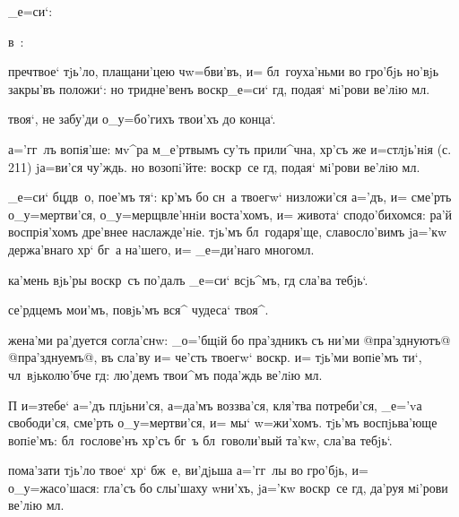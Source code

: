 
_е=си`: %

в~:%

преч твое` тjь'ло, плащани'цею ч w=бви'въ, и= 
бл~гоуха'ньми во гро'бjь но'вjь закры'въ положи`: но 
тридне'венъ воскр _е=си` гд, подая` мi'рови ве'лiю 
мл.

твоя`, не забу'ди о_у=бо'гихъ твои'хъ до конца`.

а='гг~лъ вопiя'ше: мv^ра м_е'ртвымъ су'ть прили^чна, 
хр'съ же и=стлjь'нiя (с. 211) jа=ви'ся чу'ждь. но 
возопi'йте: воскр~се гд, подая` мi'рови ве'лiю мл.

_е=си` бц дв~о, пое'мъ тя`: кр'мъ бо сн~а твоегw` 
низложи'ся а='дъ, и= сме'рть о_у=мертви'ся, 
о_у=мерщвле'ннiи воста'хомъ, и= живота` сподо'бихомся: 
ра'й воспрiя'хомъ дре'внее наслажде'нiе. тjь'мъ 
бл~годаря'ще, славосло'вимъ jа='кw держа'внаго хр` 
бг~а на'шего, и= _е=ди'наго многомл.


ка'мень вjь'ры воскр~съ по'далъ _е=си` всjь^мъ, гд 
сла'ва тебjь`.

се'рдцемъ мои'мъ, повjь'мъ вся^ чудеса` твоя^.

жена'ми ра'дуется согла'снw: _о='бщiй бо пра'здникъ съ 
ни'ми @пра'зднуютъ@ {@пра'зднуемъ@}, въ сла'ву и= че'сть 
твоегw` воскр. и= тjь'ми вопiе'мъ ти`, 
чл~вjьколю'бче гд: лю'демъ твои^мъ пода'ждь ве'лiю 
мл.

П%
и=з\ъ тебе` а='дъ плjьни'ся, а=да'мъ воззва'ся, кля'тва 
потреби'ся, _е='vа свободи'ся, сме'рть о_у=мертви'ся, и= 
мы` w=жи'хомъ. тjь'мъ воспjьва'юще вопiе'мъ: 
бл~гослове'нъ хр'съ бг~ъ бл~говоли'вый та'кw, сла'ва 
тебjь`.


пома'зати тjь'ло твое` хр` бж~е, ви'дjьша а='гг~лы во 
гро'бjь, и= о_у=жасо'шася: гла'съ бо слы'шаху w\т ни'хъ, 
jа='кw воскр~се гд, да'руя мi'рови ве'лiю мл.

